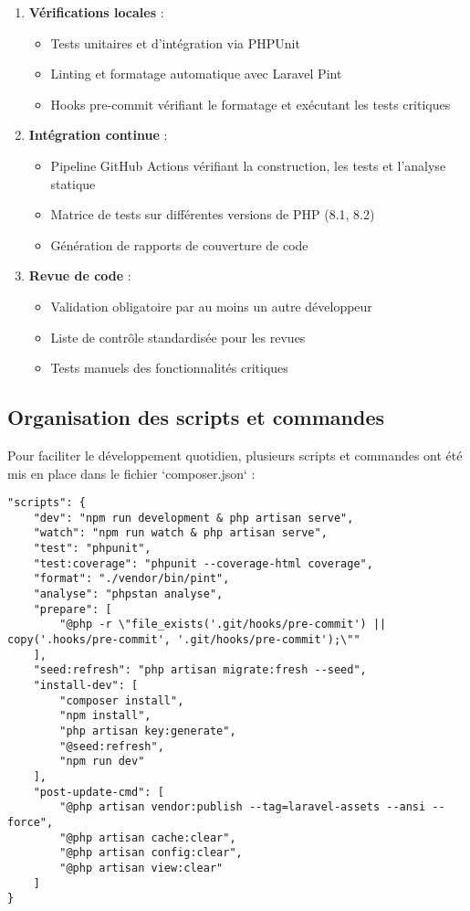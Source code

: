 \documentclass[french,12pt]{report} %
\begin{document}
\begin{enumerate}
    \item \textbf{Vérifications locales} :
    \begin{itemize}
        \item Tests unitaires et d'intégration via PHPUnit
        \item Linting et formatage automatique avec Laravel Pint
        \item Hooks pre-commit vérifiant le formatage et exécutant les tests critiques
    \end{itemize}
    
    \item \textbf{Intégration continue} :
    \begin{itemize}
        \item Pipeline GitHub Actions vérifiant la construction, les tests et l'analyse statique
        \item Matrice de tests sur différentes versions de PHP (8.1, 8.2)
        \item Génération de rapports de couverture de code
    \end{itemize}
    
    \item \textbf{Revue de code} :
    \begin{itemize}
        \item Validation obligatoire par au moins un autre développeur
        \item Liste de contrôle standardisée pour les revues
        \item Tests manuels des fonctionnalités critiques
    \end{itemize}
\end{enumerate}

\subsection{Organisation des scripts et commandes}

Pour faciliter le développement quotidien, plusieurs scripts et commandes ont été mis en place dans le fichier `composer.json` :

\begin{lstlisting}[style=phpstyle, caption={Scripts composer.json}]
"scripts": {
    "dev": "npm run development & php artisan serve",
    "watch": "npm run watch & php artisan serve",
    "test": "phpunit",
    "test:coverage": "phpunit --coverage-html coverage",
    "format": "./vendor/bin/pint",
    "analyse": "phpstan analyse",
    "prepare": [
        "@php -r \"file_exists('.git/hooks/pre-commit') || copy('.hooks/pre-commit', '.git/hooks/pre-commit');\""
    ],
    "seed:refresh": "php artisan migrate:fresh --seed",
    "install-dev": [
        "composer install",
        "npm install",
        "php artisan key:generate",
        "@seed:refresh",
        "npm run dev"
    ],
    "post-update-cmd": [
        "@php artisan vendor:publish --tag=laravel-assets --ansi --force",
        "@php artisan cache:clear",
        "@php artisan config:clear",
        "@php artisan view:clear"
    ]
}
\end{lstlisting}
\end{document}
